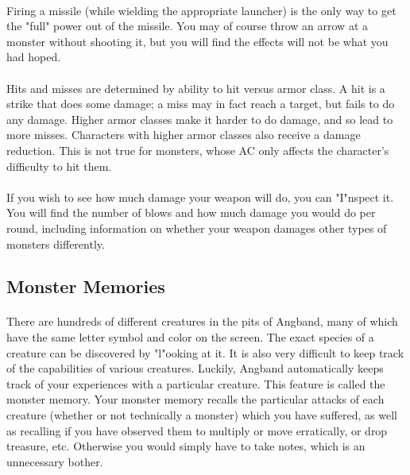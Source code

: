 \paragraph{}
Firing a missile (while wielding the appropriate launcher) is the only way
to get the "full" power out of the missile. You may of course throw an
arrow at a monster without shooting it, but you will find the effects will
not be what you had hoped. 

\paragraph{}
Hits and misses are determined by ability to hit versus armor class. A hit
is a strike that does some damage; a miss may in fact reach a target, but
fails to do any damage. Higher armor classes make it harder to do damage,
and so lead to more misses. Characters with higher armor classes also
receive a damage reduction. This is not true for monsters, whose AC only
affects the character's difficulty to hit them.

\paragraph{}
If you wish to see how much damage your weapon will do, you can "I"nspect it.
You will find the number of blows and how much damage you would do per round,
including information on whether your weapon damages other types of
monsters differently.

\subsection{Monster Memories}
\paragraph{}
There are hundreds of different creatures in the pits of Angband, many of
which have the same letter symbol and color on the screen. The exact species
of a creature can be discovered by "l"ooking at it. It is also very difficult
to keep track of the capabilities of various creatures. Luckily, Angband
automatically keeps track of your experiences with a particular creature.
This feature is called the monster memory. Your monster memory recalls the
particular attacks of each creature (whether or not technically a monster)
which you have suffered, as well as recalling if you have observed them to
multiply or move erratically, or drop treasure, etc. Otherwise you would
simply have to take notes, which is an unnecessary bother.

